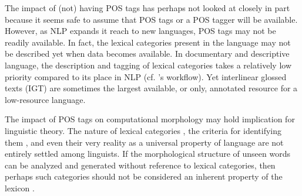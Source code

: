 
The impact of (not) having POS tags has perhaps not looked at closely in part because it seems safe to assume that POS tags or a POS tagger will be available. However, as NLP expands it reach to new languages, POS tags may not be readily available. 
In fact, the lexical categories present in the language may not be described yet when data becomes available. In documentary and descriptive language, the description and tagging of lexical categories takes a relatively low priority compared to its place in NLP (cf. \citet{bird_machine_2012}'s workflow). Yet interlinear glossed texts (IGT) are sometimes the largest available, or only, annotated resource for a low-resource language. 

The impact of POS tags on computational morphology may hold implication for linguistic theory. 
The nature of lexical categories \citep{rauh_syntactic_2010}, the criteria for identifying them  \citep{croft_parts_2000}, and even their very reality as a universal property of language \citep{gil_word_2005} are not entirely settled among linguists. 
If the morphological structure of unseen words can be analyzed and generated without reference to lexical categories, then perhaps such categories should not be considered an inherent property of the lexicon \citep{rauh_linguistic_2016}.

